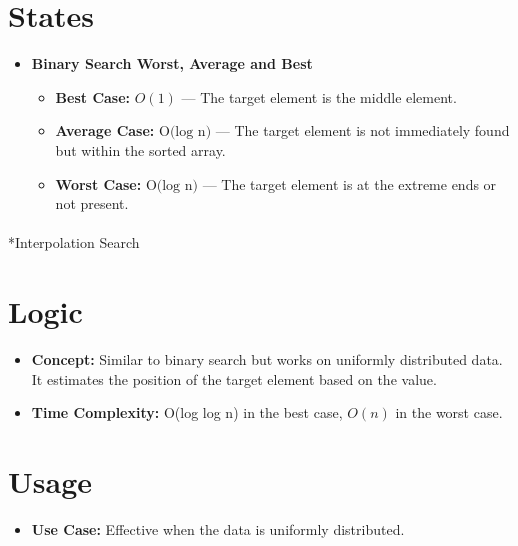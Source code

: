 \documentclass[
  letterpaper,
  DIV=11,
  numbers=noendperiod]{scrreprt}
\makeatletter
\let\oldparagraph\paragraph
\renewcommand{\paragraph}{
    \@ifstar
      \xxxParagraphStar
      \xxxParagraphNoStar
  }
\newcommand{\xxxParagraphStar}[1]{\oldparagraph*{#1}\mbox{}}
\newcommand{\xxxParagraphNoStar}[1]{\oldparagraph{#1}\mbox{}}
\providecommand{\tightlist}{%
  \setlength{\itemsep}{0pt}\setlength{\parskip}{0pt}}
\makeatother
\begin{document}
\section{States}

\begin{itemize}
\item
  \textbf{Binary Search Worst, Average and Best}

  \begin{itemize}
  \tightlist
  \item
    \textbf{Best Case:} \(O(1)\) --- The target element is the middle
    element.
  \item
    \textbf{Average Case:} \(\text{O(log⁡ n)}\) --- The target element is
    not immediately found but within the sorted array.
  \item
    \textbf{Worst Case:} \(\text{O(log⁡ n)}\) --- The target element is
    at the extreme ends or not present.
  \end{itemize}
\end{itemize}

\paragraph*{Interpolation Search}\label{interpolation-search}

\section{Logic}

\begin{itemize}
\tightlist
\item
  \textbf{Concept:} Similar to binary search but works on uniformly
  distributed data. It estimates the position of the target element
  based on the value.
\item
  \textbf{Time Complexity:} O(log ⁡log ⁡n) in the best case, \(O(n)\) in
  the worst case.
\end{itemize}

\section{Usage}

\begin{itemize}
\tightlist
\item
  \textbf{Use Case:} Effective when the data is uniformly distributed.
\end{itemize}
\end{document}
